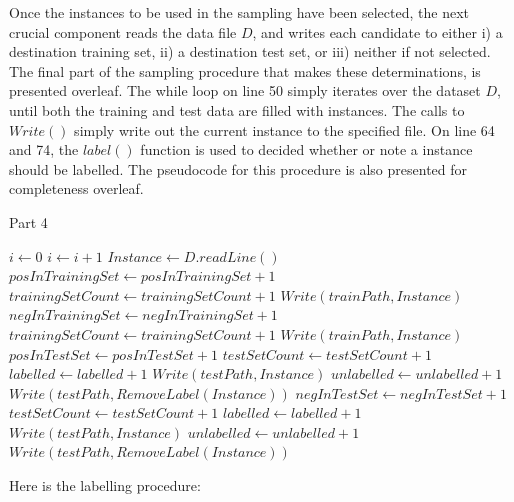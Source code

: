 \documentclass[twoside,a4paper]{refart}
\begin{document}
Once the instances to be used in the sampling have been selected, the next crucial component reads the data file $D$, and writes each candidate to either i) a destination training set, ii) a destination test set, or iii) neither if not selected. The final part of the sampling procedure that makes these determinations, is presented overleaf.
\newpage
The while loop on line 50 simply iterates over the dataset $D$, until both the training and test data are filled with instances. The calls to $Write()$ simply write out the current instance to the specified file. On line 64 and 74, the $label()$ function is used to decided whether or note a instance should be labelled. The pseudocode for this procedure is also presented for completeness overleaf.
\begin{algorithm}[!h]
\small
\caption{Part 4}
\begin{algorithmic}[1]
\State $i \leftarrow 0$
      \State $i\gets i+1$
      \State $Instance \leftarrow D.readLine()$
      	\State $posInTrainingSet \gets posInTrainingSet+1$
      	\State $trainingSetCount \gets trainingSetCount+1$
      	\State $Write(trainPath,Instance)$
      \State $negInTrainingSet \gets negInTrainingSet+1$
      	\State $trainingSetCount \gets trainingSetCount+1$
      	\State $Write(trainPath,Instance)$
      \State $posInTestSet \gets posInTestSet+1$
      	\State $testSetCount \gets testSetCount+1$
      		\State $labelled \leftarrow labelled +1$
      		\State $Write(testPath,Instance)$
      	\Else
      	\State $unlabelled \leftarrow unlabelled +1$
      		\State $Write(testPath,RemoveLabel(Instance))$
      	\EndIf
      \State $negInTestSet \gets negInTestSet+1$
      	\State $testSetCount \gets testSetCount+1$
      		\State $labelled \leftarrow labelled +1$
      		\State $Write(testPath,Instance)$
      	\Else
      	\State $unlabelled \leftarrow unlabelled +1$
      		\State $Write(testPath,RemoveLabel(Instance))$
      	\EndIf
      \EndIf
   \EndWhile
\EndProcedure
\end{algorithmic}
\end{algorithm}
\clearpage
Here is the labelling procedure:
\end{document}
